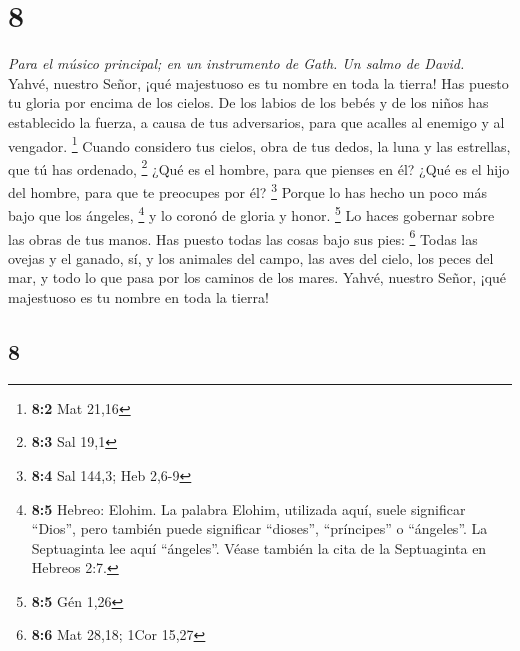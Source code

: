\begin{paracol}{2}
\hypertarget{section-14}{%
\section{8}\label{section-14}}

\emph{Para el músico principal; en un instrumento de Gath. Un salmo de
David.}\\
 Yahvé, nuestro Señor, ¡qué majestuoso es tu nombre en
toda la tierra! Has puesto tu gloria por encima de los cielos.
 De los labios de los bebés y de los niños has establecido
la fuerza, a causa de tus adversarios, para que acalles al enemigo y al
vengador. \footnote{\textbf{8:2} Mat 21,16}  Cuando
considero tus cielos, obra de tus dedos, la luna y las estrellas, que tú
has ordenado, \footnote{\textbf{8:3} Sal 19,1}  ¿Qué es el
hombre, para que pienses en él? ¿Qué es el hijo del hombre, para que te
preocupes por él? \footnote{\textbf{8:4} Sal 144,3; Heb 2,6-9}
 Porque lo has hecho un poco más bajo que los ángeles,
\footnote{\textbf{8:5} Hebreo: Elohim. La palabra Elohim, utilizada
  aquí, suele significar ``Dios'', pero también puede significar
  ``dioses'', ``príncipes'' o ``ángeles''. La Septuaginta lee aquí
  ``ángeles''. Véase también la cita de la Septuaginta en Hebreos 2:7.}
y lo coronó de gloria y honor. \footnote{\textbf{8:5} Gén 1,26}
 Lo haces gobernar sobre las obras de tus manos. Has
puesto todas las cosas bajo sus pies: \footnote{\textbf{8:6} Mat 28,18;
  1Cor 15,27}  Todas las ovejas y el ganado, sí, y los
animales del campo,  las aves del cielo, los peces del
mar, y todo lo que pasa por los caminos de los mares. 
Yahvé, nuestro Señor, ¡qué majestuoso es tu nombre en toda la tierra!

\switchcolumn
\begin{otherlanguage}{english}

\hypertarget{section-15}{%
\section{8}\label{section-15}}


\end{otherlanguage}
\end{paracol}
